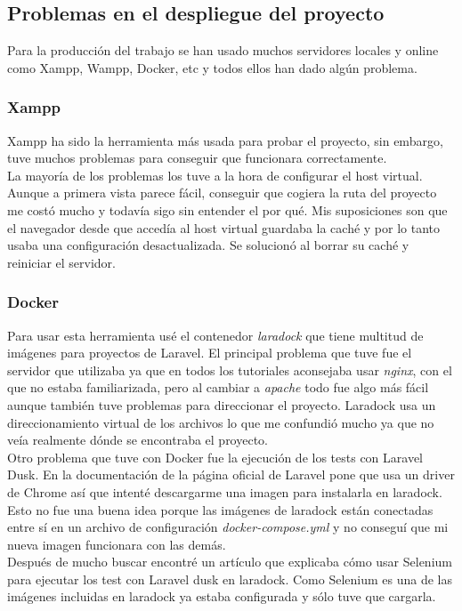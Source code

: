 \subsection{Problemas en el despliegue del proyecto}
Para la producción del trabajo se han usado muchos servidores locales y online como Xampp, Wampp, Docker, etc y todos ellos han dado algún problema.\\
\subsubsection{Xampp}
Xampp ha sido la herramienta más usada para probar el proyecto, sin embargo, tuve muchos problemas para conseguir que funcionara correctamente.\\
La mayoría de los problemas los tuve a la hora de configurar el host virtual.
Aunque a primera vista parece fácil, conseguir que cogiera la ruta del proyecto me costó mucho y todavía sigo sin entender el por qué. Mis suposiciones son que el navegador desde que accedía al host virtual guardaba la caché y por lo tanto usaba una configuración desactualizada. Se solucionó al borrar su caché y reiniciar el servidor.
\subsubsection{Docker}
Para usar esta herramienta usé el contenedor \textit{laradock} que tiene multitud de imágenes para proyectos de Laravel. El principal problema que tuve fue el servidor que utilizaba ya que en todos los tutoriales aconsejaba usar \textit{nginx}, con el que no estaba familiarizada, pero al cambiar a \textit{apache} todo fue algo más fácil aunque también tuve problemas para direccionar el proyecto.
Laradock usa un direccionamiento virtual de los archivos lo que me confundió mucho ya que no veía realmente dónde se encontraba el proyecto.\\
Otro problema que tuve con Docker fue la ejecución de los tests con Laravel Dusk. En la documentación de la página oficial de Laravel pone que usa un driver de Chrome así que intenté descargarme una imagen para instalarla en laradock. Esto no fue una buena idea porque las imágenes de laradock están conectadas entre sí en un archivo de configuración \textit{docker-compose.yml} y no conseguí que mi nueva imagen funcionara con las demás.\\
Después de mucho buscar encontré un artículo \cite{selenium} que explicaba cómo usar Selenium para ejecutar los test con Laravel dusk en laradock. Como Selenium es una de las imágenes incluidas en laradock ya estaba configurada y sólo tuve que cargarla.
